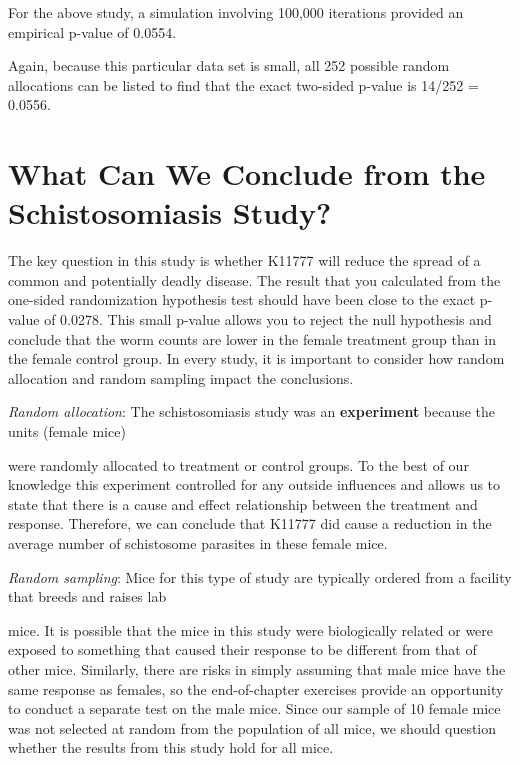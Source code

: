 \documentclass[
]{report}
\theoremstyle{definition}
\theoremstyle{definition}
\theoremstyle{definition}
\theoremstyle{definition}
\theoremstyle{remark}
\begin{document}
For the above study, a simulation involving 100,000 iterations provided an empirical p-value of 0.0554.

Again, because this particular data set is small, all 252 possible random allocations can be listed to find that
the exact two-sided p-value is 14/252 = 0.0556.

\hypertarget{what-can-we-conclude-from-the-schistosomiasis-study}{%
\section{\texorpdfstring{\textbf{What Can We Conclude from the Schistosomiasis Study?}}{What Can We Conclude from the Schistosomiasis Study?}}\label{what-can-we-conclude-from-the-schistosomiasis-study}}

The key question in this study is whether K11777 will reduce the spread of a common and potentially deadly
disease. The result that you calculated from the one-sided randomization hypothesis test should have been
close to the exact p-value of 0.0278. This small p-value allows you to reject the null hypothesis and conclude
that the worm counts are lower in the female treatment group than in the female control group. In every study,
it is important to consider how random allocation and random sampling impact the conclusions.

\emph{Random allocation}: The schistosomiasis study was an \textbf{experiment} because the units (female mice)

were randomly allocated to treatment or control groups. To the best of our knowledge this experiment
controlled for any outside influences and allows us to state that there is a cause and effect relationship
between the treatment and response. Therefore, we can conclude that K11777 did cause a reduction in
the average number of schistosome parasites in these female mice.

\emph{Random sampling}: Mice for this type of study are typically ordered from a facility that breeds and raises lab

mice. It is possible that the mice in this study were biologically related or were exposed to something that
caused their response to be different from that of other mice. Similarly, there are risks in simply assuming
that male mice have the same response as females, so the end-of-chapter exercises provide an opportunity to conduct a separate test on the male mice. Since our sample of 10 female mice was not selected at random
from the population of all mice, we should question whether the results from this study hold for all mice.
\end{document}
